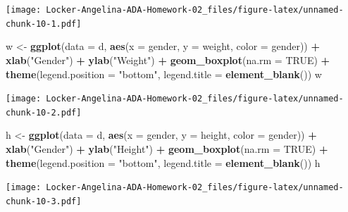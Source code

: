 \documentclass[]{article}
\newenvironment{Shaded}{\begin{snugshade}}{\end{snugshade}}
\newcommand{\KeywordTok}[1]{\textcolor[rgb]{0.13,0.29,0.53}{\textbf{#1}}}
\newcommand{\DataTypeTok}[1]{\textcolor[rgb]{0.13,0.29,0.53}{#1}}
\newcommand{\StringTok}[1]{\textcolor[rgb]{0.31,0.60,0.02}{#1}}
\newcommand{\OtherTok}[1]{\textcolor[rgb]{0.56,0.35,0.01}{#1}}
\newcommand{\OperatorTok}[1]{\textcolor[rgb]{0.81,0.36,0.00}{\textbf{#1}}}
\newcommand{\NormalTok}[1]{#1}
\begin{document}
\texttt{[image: Locker-Angelina-ADA-Homework-02\_files/figure-latex/unnamed-chunk-10-1.pdf]}

\begin{Shaded}
\begin{Highlighting}[]
\NormalTok{w <-}\StringTok{ }\KeywordTok{ggplot}\NormalTok{(}\DataTypeTok{data =}\NormalTok{ d, }\KeywordTok{aes}\NormalTok{(}\DataTypeTok{x =}\NormalTok{ gender, }\DataTypeTok{y =}\NormalTok{ weight, }\DataTypeTok{color =}\NormalTok{ gender)) }\OperatorTok{+}\StringTok{ }\KeywordTok{xlab}\NormalTok{(}\StringTok{"Gender"}\NormalTok{) }\OperatorTok{+}\StringTok{ }\KeywordTok{ylab}\NormalTok{(}\StringTok{"Weight"}\NormalTok{) }\OperatorTok{+}\StringTok{ }\KeywordTok{geom_boxplot}\NormalTok{(}\DataTypeTok{na.rm =} \OtherTok{TRUE}\NormalTok{) }\OperatorTok{+}\StringTok{ }\KeywordTok{theme}\NormalTok{(}\DataTypeTok{legend.position =} \StringTok{"bottom"}\NormalTok{, }\DataTypeTok{legend.title =} \KeywordTok{element_blank}\NormalTok{())}
\NormalTok{w}
\end{Highlighting}
\end{Shaded}

\texttt{[image: Locker-Angelina-ADA-Homework-02\_files/figure-latex/unnamed-chunk-10-2.pdf]}

\begin{Shaded}
\begin{Highlighting}[]
\NormalTok{h <-}\StringTok{ }\KeywordTok{ggplot}\NormalTok{(}\DataTypeTok{data =}\NormalTok{ d, }\KeywordTok{aes}\NormalTok{(}\DataTypeTok{x =}\NormalTok{ gender, }\DataTypeTok{y =}\NormalTok{ height, }\DataTypeTok{color =}\NormalTok{ gender)) }\OperatorTok{+}\StringTok{ }\KeywordTok{xlab}\NormalTok{(}\StringTok{"Gender"}\NormalTok{) }\OperatorTok{+}\StringTok{ }\KeywordTok{ylab}\NormalTok{(}\StringTok{"Height"}\NormalTok{) }\OperatorTok{+}\StringTok{ }\KeywordTok{geom_boxplot}\NormalTok{(}\DataTypeTok{na.rm =} \OtherTok{TRUE}\NormalTok{) }\OperatorTok{+}\StringTok{ }\KeywordTok{theme}\NormalTok{(}\DataTypeTok{legend.position =} \StringTok{"bottom"}\NormalTok{, }\DataTypeTok{legend.title =} \KeywordTok{element_blank}\NormalTok{())}
\NormalTok{h}
\end{Highlighting}
\end{Shaded}

\texttt{[image: Locker-Angelina-ADA-Homework-02\_files/figure-latex/unnamed-chunk-10-3.pdf]}
\end{document}
